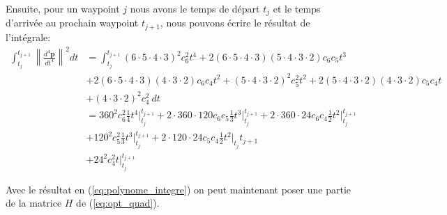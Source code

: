 \documentclass{article}
\newcommand{\norm}[1]{\left\lVert#1\right\rVert}
\begin{document}
Ensuite, pour un waypoint $j$ nous avons le temps de départ $t_j$ et le temps d'arrivée au prochain waypoint $t_{j+1}$, nous pouvons écrire le résultat de l'intégrale:
\begin{align}\label{eq:polynome_integre}
\int_{t_j}^{t_{j+1}} \norm{\frac{d^4 \boldsymbol{p}}{dt^4}}^2 dt
	& = \int_{t_j}^{t_{j+1}} (6\cdot 5\cdot 4\cdot 3)^2 c_6^2 t^4 + 2(6\cdot 5\cdot 4\cdot 3)(5 \cdot 4\cdot 3\cdot 2) c_6 c_5 t^3 \\
	&	+ 2(6 \cdot 5 \cdot 4\cdot 3)(4\cdot 3\cdot 2)c_6 c_4 t^2 + (5 \cdot 4\cdot 3\cdot 2)^2 c_5^2 t^2 + 2(5 \cdot 4\cdot 3\cdot 2)(4\cdot 3\cdot 2)c_5 c_4 t \nonumber \\
	&	+ (4\cdot 3\cdot 2)^2 c_4^2 \ dt\nonumber \\
	&=	360^2 c_6^2 \frac{1}{4} t^4 \Big|_{t_j}^{t_{j+1}}
		+ 2 \cdot 360 \cdot 120 c_6 c_5 \frac{1}{3} t^3\Big|_{t_j}^{t_{j+1}}
		+ 2 \cdot 360 \cdot 24 c_6 c_4 \frac{1}{2} t^2\Big|_{t_j}^{t_{j+1}} \nonumber \\
	&	+ 120^2 c_5^2 \frac{1}{3} t^3\Big|_{t_j}^{t_{j+1}} + 2 \cdot 120 \cdot 24 c_5 c_4 \frac{1}{2}t^2 \Big|_{t_j}{t_{j+1}} \nonumber \\
	&	+ 24^2 c_4^2 t\Big|_{t_j}^{t_{j+1}} \nonumber
\end{align}


Avec le résultat en (\ref{eq:polynome_integre}) on peut maintenant poser une partie de la matrice $H$ de (\ref{eq:opt_quad}).
\end{document}
